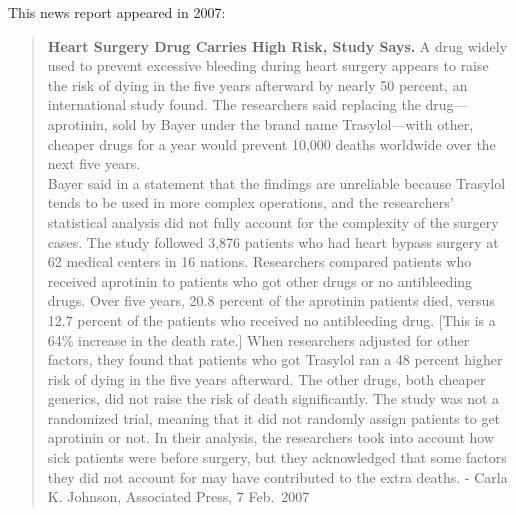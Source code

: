 \documentclass[
  letterpaper,
  DIV=11,
  numbers=noendperiod,
  oneside]{scrreprt}
\begin{document}
\begin{tcolorbox}[enhanced jigsaw, colbacktitle=quarto-callout-note-color!10!white, breakable, opacitybacktitle=0.6, colback=white, left=2mm, arc=.35mm, colframe=quarto-callout-note-color-frame, coltitle=black, toprule=.15mm, opacityback=0, leftrule=.75mm, bottomtitle=1mm, toptitle=1mm, titlerule=0mm, title=\textcolor{quarto-callout-note-color}{\faInfo}\hspace{0.5em}{Example: Covariates and Death}, rightrule=.15mm, bottomrule=.15mm]

This news report appeared in 2007:

\begin{quote}
\textbf{Heart Surgery Drug Carries High Risk, Study Says.} A drug widely
used to prevent excessive bleeding during heart surgery appears to raise
the risk of dying in the five years afterward by nearly 50 percent, an
international study found. The researchers said replacing the
drug---aprotinin, sold by Bayer under the brand name Trasylol---with
other, cheaper drugs for a year would prevent 10,000 deaths worldwide
over the next five years.\\
Bayer said in a statement that the findings are unreliable because
Trasylol tends to be used in more complex operations, and the
researchers' statistical analysis did not fully account for the
complexity of the surgery cases. The study followed 3,876 patients who
had heart bypass surgery at 62 medical centers in 16 nations.
Researchers compared patients who received aprotinin to patients who got
other drugs or no antibleeding drugs. Over five years, 20.8 percent of
the aprotinin patients died, versus 12.7 percent of the patients who
received no antibleeding drug. {[}This is a 64\% increase in the death
rate.{]} When researchers adjusted for other factors, they found that
patients who got Trasylol ran a 48 percent higher risk of dying in the
five years afterward. The other drugs, both cheaper generics, did not
raise the risk of death significantly.
{} The study
was not a randomized trial, meaning that it did not randomly assign
patients to get aprotinin or not. In their analysis, the researchers
took into account how sick patients were before surgery, but they
acknowledged that some factors they did not account for may have
contributed to the extra deaths. - Carla K. Johnson, Associated Press, 7
Feb.~2007
\end{quote}


\end{tcolorbox}
\end{document}
